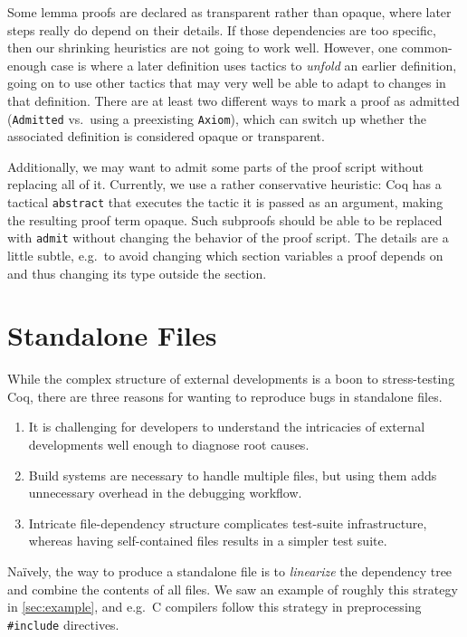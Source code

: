 \documentclass[a4paper,USenglish,cleveref,autoref,thm-restate,pdfa]{lipics-v2021}
\begin{document}
Some lemma proofs are declared as transparent rather than opaque, where later steps really do depend on their details.
If those dependencies are too specific, then our shrinking heuristics are not going to work well.
However, one common-enough case is where a later definition uses tactics to \emph{unfold} an earlier definition, going on to use other tactics that may very well be able to adapt to changes in that definition.
There are at least two different ways to mark a proof as admitted (\texttt{Admitted} vs.\ using a preexisting \texttt{Axiom}), which can switch up whether the associated definition is considered opaque or transparent.

Additionally, we may want to admit some parts of the proof script without replacing all of it.
Currently, we use a rather conservative heuristic:
Coq has a tactical \verb|abstract| that executes the tactic it is passed as an argument, making the resulting proof term opaque.
Such subproofs should be able to be replaced with \verb|admit| without changing the behavior of the proof script.
The details are a little subtle, e.g.\ to avoid changing which section variables a proof depends on and thus changing its type outside the section.

\section{Standalone Files}\label{sec:standalone}

While the complex structure of external developments is a boon to stress-testing Coq, there are three reasons for wanting to reproduce bugs in standalone files.
\begin{enumerate}
\item It is challenging for developers to understand the intricacies of external developments well enough to diagnose root causes.
\item  Build systems are necessary to handle multiple files, but using them adds unnecessary overhead in the debugging workflow.
\item Intricate file-dependency structure complicates test-suite infrastructure, whereas having self-contained files results in a simpler test suite.
\end{enumerate}

Na\"ively, the way to produce a standalone file is to \emph{linearize} the dependency tree and combine the contents of all files.
We saw an example of roughly this strategy in \autoref{sec:example}, and e.g.\ C compilers follow this strategy in preprocessing \verb|#include| directives.
\end{document}
